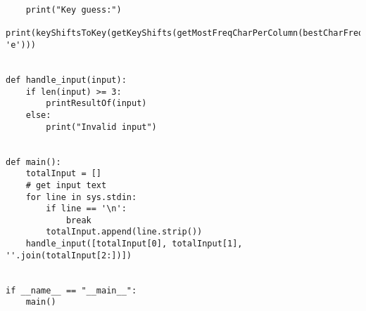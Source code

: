 \documentclass{report}
\begin{document}
\begin{lstlisting}
    print("Key guess:")
    print(keyShiftsToKey(getKeyShifts(getMostFreqCharPerColumn(bestCharFreq), 'e')))


def handle_input(input):
    if len(input) >= 3:
        printResultOf(input)
    else:
        print("Invalid input")


def main():
    totalInput = []
    # get input text
    for line in sys.stdin:
        if line == '\n':
            break
        totalInput.append(line.strip())
    handle_input([totalInput[0], totalInput[1], ''.join(totalInput[2:])])


if __name__ == "__main__":
    main()


\end{lstlisting}
\end{document}
